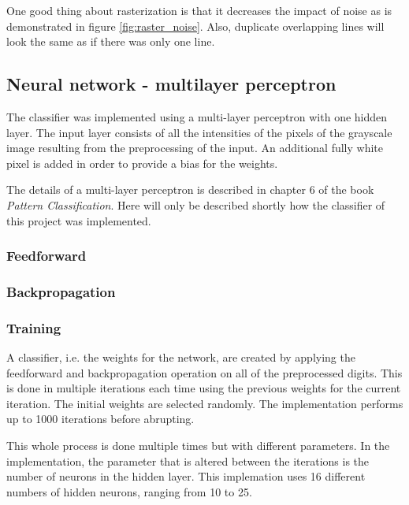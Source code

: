 \documentclass[report.tex]{subfile}
\begin{document}
One good thing about rasterization is that it decreases the impact of noise as
is demonstrated in figure \ref{fig:raster_noise}. Also, duplicate overlapping
lines will look the same as if there was only one line.

\subsection{Neural network - multilayer perceptron}
\begin{figure}
    \centering
    
    \caption{}
    \label{fig:mlp}
\end{figure}
The classifier was implemented using a multi-layer perceptron with one hidden
layer. The input layer consists of all the intensities of the pixels of the
grayscale image resulting from the preprocessing of the input. An additional
fully white pixel is added in order to provide a bias for the weights.

The details of a multi-layer perceptron is described in chapter 6 of the book
\emph{Pattern Classification}\cite{hart-pattern}. Here will only be described
shortly how the classifier of this project was implemented.

\subsubsection{Feedforward}

\subsubsection{Backpropagation}

\subsubsection{Training}
A classifier, i.e. the weights for the network, are created by applying the
feedforward and backpropagation operation on all of the preprocessed digits.
This is done in multiple iterations each time using the previous weights for
the current iteration. The initial weights are selected randomly. The
implementation performs up to 1000 iterations before abrupting.

This whole process is done multiple times but with different parameters. In the
implementation, the parameter that is altered between the iterations is the
number of neurons in the hidden layer. This implemation uses 16 different
numbers of hidden neurons, ranging from 10 to 25. 
\end{document}
